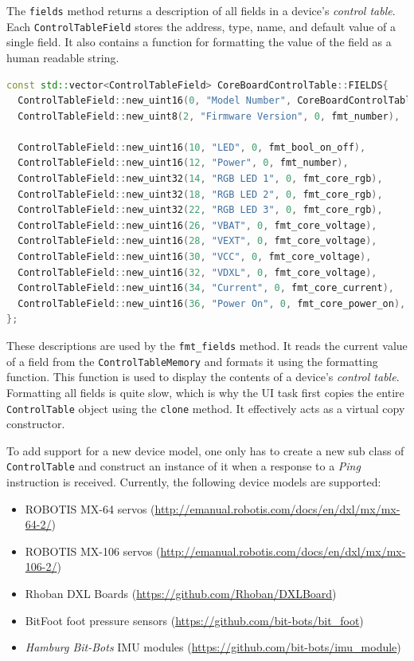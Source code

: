 The \lstinline{fields} method returns a description of all fields in a device's \textit{control table}.
Each \lstinline{ControlTableField} stores the address, type, name, and default value of a single
field. It also contains a function for formatting the value of the field as a human readable string.

\begin{lstlisting}[language=C++, caption={Definition of the control table fields of a Rhoban DXL Board}]
const std::vector<ControlTableField> CoreBoardControlTable::FIELDS{
  ControlTableField::new_uint16(0, "Model Number", CoreBoardControlTable::MODEL_NUMBER, fmt_number),
  ControlTableField::new_uint8(2, "Firmware Version", 0, fmt_number),

  ControlTableField::new_uint16(10, "LED", 0, fmt_bool_on_off),
  ControlTableField::new_uint16(12, "Power", 0, fmt_number),
  ControlTableField::new_uint32(14, "RGB LED 1", 0, fmt_core_rgb),
  ControlTableField::new_uint32(18, "RGB LED 2", 0, fmt_core_rgb),
  ControlTableField::new_uint32(22, "RGB LED 3", 0, fmt_core_rgb),
  ControlTableField::new_uint16(26, "VBAT", 0, fmt_core_voltage),
  ControlTableField::new_uint16(28, "VEXT", 0, fmt_core_voltage),
  ControlTableField::new_uint16(30, "VCC", 0, fmt_core_voltage),
  ControlTableField::new_uint16(32, "VDXL", 0, fmt_core_voltage),
  ControlTableField::new_uint16(34, "Current", 0, fmt_core_current),
  ControlTableField::new_uint16(36, "Power On", 0, fmt_core_power_on),
};
\end{lstlisting}

These descriptions are used by the \lstinline{fmt_fields} method. It reads the current value of a
field from the \lstinline{ControlTableMemory} and formats it using the formatting function. This
function is used to display the contents of a device's \textit{control table}. Formatting all fields
is quite slow, which is why the UI task first copies the entire \lstinline{ControlTable} object using
the \lstinline{clone} method. It effectively acts as a virtual copy constructor.

To add support for a new device model, one only has to create a new sub class of \lstinline{ControlTable}
and construct an instance of it when a response to a \textit{Ping} instruction is received. Currently,
the following device models are supported:

\begin{itemize}
    \item ROBOTIS MX-64 servos (\url{http://emanual.robotis.com/docs/en/dxl/mx/mx-64-2/})
    \item ROBOTIS MX-106 servos (\url{http://emanual.robotis.com/docs/en/dxl/mx/mx-106-2/})
    \item Rhoban DXL Boards (\url{https://github.com/Rhoban/DXLBoard})
    \item BitFoot foot pressure sensors (\url{https://github.com/bit-bots/bit_foot})
    \item \textit{Hamburg Bit-Bots} IMU modules (\url{https://github.com/bit-bots/imu_module})
\end{itemize}
